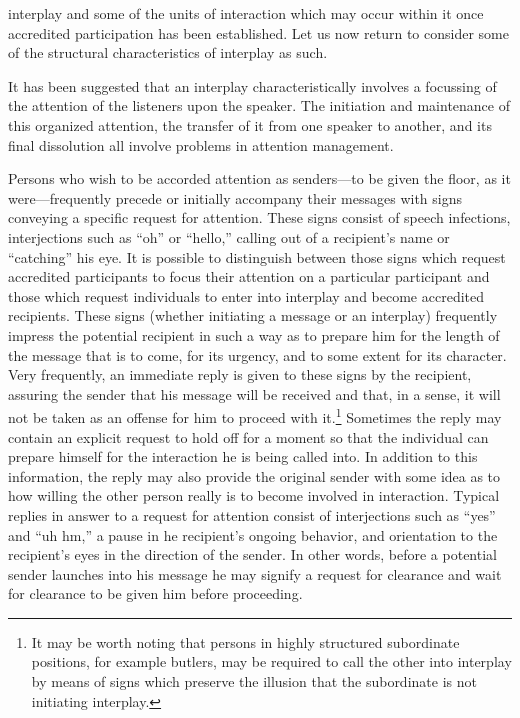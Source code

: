 \documentclass[openany,nobib]{tufte-book}
\begin{document}
interplay and some of the units of interaction
which may occur within it once accredited participation has been
established. Let us now return to consider some of the structural
characteristics of interplay as such.

It has been suggested that an interplay characteristically involves a
focussing of the attention of the listeners upon the speaker. The
initiation and maintenance of this organized attention, the transfer of
it from one speaker to another, and its final dissolution all involve
problems in attention management.

Persons who wish to be accorded attention as senders---to be given the
floor, as it were---frequently precede or initially accompany their
messages with signs conveying a specific request for attention. These
signs consist of speech infections, interjections such as ``oh'' or
``hello,'' calling out of a recipient's name or ``catching'' his eye. It
is possible to distinguish between those signs which request accredited
participants to focus their attention on a particular participant and
those which request individuals to enter into interplay and become
accredited recipients. These signs (whether initiating a message or an
interplay) frequently impress the potential recipient in such a way as
to prepare him for the length of the message that is to come, for its
urgency, and to some extent for its character. Very frequently, an
immediate reply is given to these signs by the recipient, assuring the
sender that his message will be received and that, in a sense, it will
not be taken as an offense for him to proceed with it.\footnote{It may
  be worth noting that persons in highly structured subordinate
  positions, for example butlers, may be required to call the other into
  interplay by means of signs which preserve the illusion that the
  subordinate is not initiating interplay.} Sometimes the reply may
contain an explicit request to hold off for a moment so that the
individual can prepare himself for the interaction he is being called
into. In addition to this information, the reply may also provide the
original sender with some idea as to how willing the other person really
is to become involved in interaction. Typical replies in answer to a
request for attention consist of interjections such as ``yes'' and ``uh
hm,'' a pause in he recipient's ongoing behavior, and orientation to the
recipient's eyes in the direction of the sender. In other words, before
a potential sender launches into his message he may signify a request
for clearance and wait for clearance to be given him before proceeding.
\end{document}
